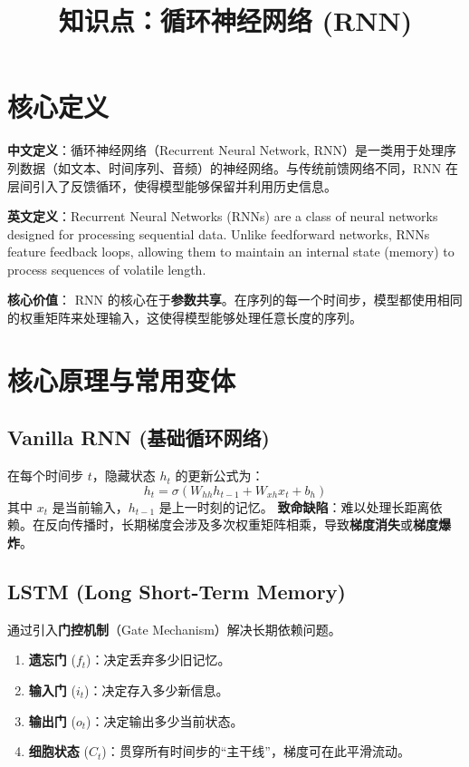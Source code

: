 \documentclass[12pt, a4paper]{article}
\title{知识点：循环神经网络 (RNN)}
\author{}
\date{}
\begin{document}
\maketitle

\section{核心定义}
\textbf{中文定义}：循环神经网络（Recurrent Neural Network, RNN）是一类用于处理序列数据（如文本、时间序列、音频）的神经网络。与传统前馈网络不同，RNN 在层间引入了反馈循环，使得模型能够保留并利用历史信息。

\textbf{英文定义}：Recurrent Neural Networks (RNNs) are a class of neural networks designed for processing sequential data. Unlike feedforward networks, RNNs feature feedback loops, allowing them to maintain an internal state (memory) to process sequences of volatile length.

\textbf{核心价值}：
RNN 的核心在于\textbf{参数共享}。在序列的每一个时间步，模型都使用相同的权重矩阵来处理输入，这使得模型能够处理任意长度的序列。

\section{核心原理与常用变体}

\subsection{Vanilla RNN (基础循环网络)}
在每个时间步 $t$，隐藏状态 $h_t$ 的更新公式为：
$$ h_t = \sigma(W_{hh} h_{t-1} + W_{xh} x_t + b_h) $$
其中 $x_t$ 是当前输入，$h_{t-1}$ 是上一时刻的记忆。
\textbf{致命缺陷}：难以处理长距离依赖。在反向传播时，长期梯度会涉及多次权重矩阵相乘，导致\textbf{梯度消失}或\textbf{梯度爆炸}。

\subsection{LSTM (Long Short-Term Memory)}
通过引入\textbf{门控机制}（Gate Mechanism）解决长期依赖问题。
\begin{enumerate}
    \item \textbf{遗忘门} ($f_t$)：决定丢弃多少旧记忆。
    \item \textbf{输入门} ($i_t$)：决定存入多少新信息。
    \item \textbf{输出门} ($o_t$)：决定输出多少当前状态。
    \item \textbf{细胞状态} ($C_t$)：贯穿所有时间步的“主干线”，梯度可在此平滑流动。
\end{enumerate}
\end{document}
